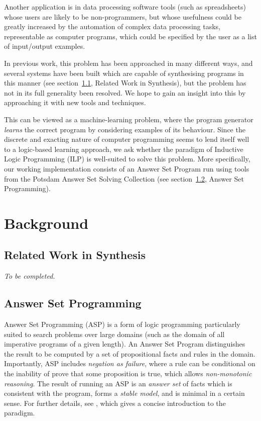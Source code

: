 \documentclass[a4paper,twoside,notitlepage]{article}
\begin{document}
Another application is in data processing software tools (such as spreadsheets) whose 
users are likely to be non-programmers, but whose usefulness could be greatly increased 
by the automation of complex data processing tasks, representable as computer programs, 
which could be specified by the user as a list of input/output examples.

In previous work, this problem has been approached in many different ways, and several 
systems have been built which are capable of synthesising programs in this manner (see 
section~\ref{sec:prgsyn}, Related Work in Synthesis), but the problem has not in its 
full generality been resolved. We hope to gain an insight into this by approaching it 
with new tools and techniques.

This can be viewed as a machine-learning problem, where the program generator 
\emph{learns} the correct program by considering examples of its behaviour. Since the 
discrete and exacting nature of computer programming seems to lend itself well to a 
logic-based learning approach, we ask whether the paradigm of Inductive Logic 
Programming (ILP)\cite{muggleton94} is well-suited to solve this problem. More 
specifically, our working implementation consists of an Answer Set Program run using 
tools from the Potsdam Answer Set Solving Collection\cite{potassco} (see 
section~\ref{sec:asp}, Answer Set Programming).

\section{Background}

\subsection{Related Work in Synthesis} \label{sec:prgsyn}
\emph{To be completed.}

\subsection{Answer Set Programming} \label{sec:asp}

Answer Set Programming (ASP) is a form of logic programming particularly suited to 
search problems over large domains (such as the domain of all imperative programs of a 
given length). An Answer Set Program distinguishes the result to be computed by a set 
of propositional facts and rules in the domain. Importantly, ASP includes 
\emph{negation as failure}, where a rule can be conditional on the inability of prove 
that some proposition is true, which allows \emph{non-monotonic reasoning}. The result 
of running an ASP is an \emph{answer set} of facts which is consistent with the 
program, forms a \emph{stable model}, and is minimal in a certain sense. For further 
details, see \cite{glimpse}, which gives a concise introduction to the paradigm.
\end{document}
